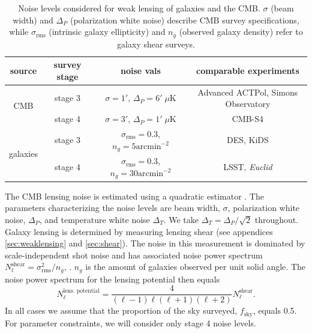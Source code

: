 \documentclass[11pt]{article} %
\begin{document}
\begin{table}[h!]
    \centering
    \begin{tabular}{|c|c|c|c|}
    \hline
    \textbf{source} & \textbf{survey stage} & \textbf{noise vals} & \textbf{comparable experiments} \\
    \hline 
    \multirow{2}{*}{CMB} 
        & stage 3 & $\sigma = 1'$, $\Delta_P = 6' \; \mu \text{K}$ & Advanced ACTPol, Simons Observatory \\
    \cline{2-4}
        & stage 4 & $\sigma = 3'$, $\Delta_P = 1' \; \mu \text{K}$ & CMB-S4 \\
    \hline
    \multirow{2}{*}{galaxies} 
        & stage 3 & $\sigma_{\text{rms}} = 0.3$, $n_g = 5 \text{arcmin}^{-2}$ & DES, KiDS \\
    \cline{2-4}
        & stage 4 & $\sigma_{\text{rms}} = 0.3$, $n_g = 30 \text{arcmin}^{-2}$ & LSST, \textit{Euclid} \\
    \hline
    \end{tabular}
    \caption{Noise levels considered for weak lensing of galaxies and the CMB. $\sigma$ (beam width) and $\Delta_P$ (polarization white noise) describe CMB survey specifications, while $\sigma_{\text{rms}}$ (intrinsic galaxy ellipticity) and $n_g$ (observed galaxy density) refer to galaxy shear surveys.}
    \label{tab:noiselevels}
\end{table}

The CMB lensing noise is estimated using a quadratic estimator \cite{Maniyar2021_QE_CMBLensing}.
The parameters characterizing the noise levels are beam width, $\sigma$, polarization white noise, $\Delta_P$, and temperature white noise $\Delta_T$. We take $\Delta_T = \Delta_P / \sqrt 2$ throughout. Galaxy lensing is determined by measuring lensing shear (see appendices \ref{sec:weaklensing} and \ref{sec:shear}). The noise in this measurement is dominated by scale-independent shot noise and has associated noise power spectrum $N_l^{\text{shear}} = \sigma_{\text{rms}}^2 / n_g$, \cite{Bartelmann2001}. $n_g$ is the amount of galaxies observed per unit solid angle. The noise power spectrum for the lensing potential then equals
\begin{equation*}
    N_\ell^{\text{lens. potential}} = \frac{4}{(\ell-1)\ell(\ell+1)(\ell+2)}N_\ell^{\text{shear}}.
\end{equation*}
In all cases we assume that the proportion of the sky surveyed, $f_{\text{sky}}$, equals 0.5.
For parameter constraints, we will consider only stage 4 noise levels.
\end{document}
